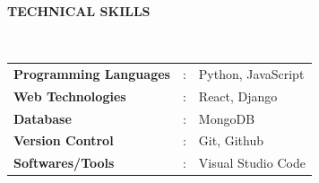 \documentclass[a4paper,10pt]{article}
\begin{document}
\colorbox{titleColor}{\parbox{6.7in}{\textbf{TECHNICAL SKILLS}}}\\

\begin{tabular}{p{1.6in}p{0.1in}p{4.5in}}
  \textbf{\small{Programming Languages}} & : & {{Python, JavaScript}}  \\
  \textbf{\small{Web Technologies}}      & : & {{React, Django}}       \\
  \textbf{\small{Database}}              & : & {{MongoDB}}             \\
  \textbf{\small{Version Control}}       & : & {{Git, Github}}         \\
  \textbf{\small{Softwares/Tools}}       & : & {{ Visual Studio Code}} \\
\end{tabular}





\end{document}
